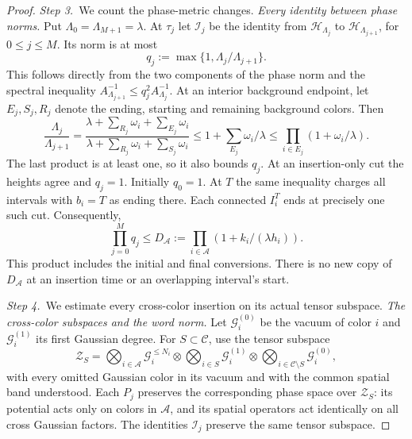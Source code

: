 \documentclass[12pt,oneside,openany]{book}
\numberwithin{equation}{section}
\theoremstyle{nogostyle}
\theoremstyle{definition}
\begin{document}
\begin{proof}
  \medskip
  \noindent\textit{Step 3.~}We count the phase-metric changes.
  \emph{Every identity between phase norms.} Put $\Lambda_0 = \Lambda_{M+1} =
  \lambda$. At $\tau_j$ let $\mathscr{I}_j$ be the identity from
  $\mathcal{H}_{\Lambda_j}$ to $\mathcal{H}_{\Lambda_{j+1}}$, for $0 \le j \le
  M$. Its norm is at most
  \[
    q_j:=\max\{1,\Lambda_j/\Lambda_{j+1}\}.
  \]
  This follows directly from the two components of the phase norm and the
  spectral inequality $A_{\Lambda_{j+1}}^{-1} \le q_j^2 A_{\Lambda_j}^{-1}$. At
  an interior background endpoint, let $E_j,S_j,R_j$ denote the ending, starting
  and remaining background colors. Then
  \[
    \frac{\Lambda_j}{\Lambda_{j+1}}
    =\frac{\lambda+\sum_{R_j}\omega_i+\sum_{E_j}\omega_i}
    {\lambda+\sum_{R_j}\omega_i+\sum_{S_j}\omega_i}
    \le1+\sum_{E_j}\omega_i/\lambda
    \le\prod_{i\in E_j}(1+\omega_i/\lambda).
  \]
  The last product is at least one, so it also bounds $q_j$. At an
  insertion-only cut the heights agree and $q_j = 1$. Initially $q_0 = 1$. At
  $T$ the same inequality charges all intervals with $b_i = T$ as ending there.
  Each connected $I_i^T$ ends at precisely one such cut. Consequently,
  \begin{equation}\label{E:interval-copy-metric}
    \prod_{j=0}^M q_j
    \le D_{\mathcal{A}}:=
    \prod_{i\in\mathcal{A}}(1+k_i/(\lambda h_i)).
  \end{equation}
  This product includes the initial and final conversions. There is no new copy
  of $D_{\mathcal{A}}$ at an insertion time or an overlapping interval's start.

  


  \medskip
  \noindent\textit{Step 4.~}We estimate every cross-color insertion on its
  actual tensor subspace.
  \emph{The cross-color subspaces and the word norm.} Let $\mathscr{G}_i^{(0)}$
  be the vacuum of color $i$ and $\mathscr{G}_i^{(1)}$ its first Gaussian
  degree. For $S \subset \mathcal{C}$, use the tensor subspace
  \[
    \mathscr{Z}_S=
    \bigotimes_{i\in\mathcal{A}}\mathscr{G}_i^{\le N_i}
    \otimes\bigotimes_{i\in S}\mathscr{G}_i^{(1)}
    \otimes\bigotimes_{i\in\mathcal{C}\setminus S}
    \mathscr{G}_i^{(0)},
  \]
  with every omitted Gaussian color in its vacuum and with the common spatial
  band understood. Each $P_j$ preserves the corresponding phase space over
  $\mathscr{Z}_S$: its potential acts only on colors in $\mathcal{A}$, and its
  spatial operators act identically on all cross Gaussian factors. The
  identities $\mathscr{I}_j$ preserve the same tensor subspace.


\end{proof}
\end{document}

